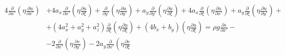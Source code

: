 \begin{equation*}
    \begin{split}
        4
        \frac
            {\partial }
            {\partial x'}
        \left(
            \eta
            \frac
                {\partial u}
                {\partial x'}
        \right)
        &
        +
        4
        a_x
        \frac
            {\partial }
            {\partial x'}
        \left(
            \eta
            \frac
                {\partial u}
                {\partial \xi}
        \right)
        +
        \frac
            {\partial }
            {\partial y'}
        \left(
            \eta
            \frac
                {\partial u}
                {\partial y'}
        \right)
        +
        a_y
        \frac
            {\partial }
            {\partial y'}
        \left(
            \eta
            \frac
                {\partial u}
                {\partial \xi}
        \right)
        +
        4
        a_x
        \frac
            {\partial }
            {\partial \xi}
        \left(
            \eta
            \frac
                {\partial u}
                {\partial x'}
        \right)
        +
        a_y
        \frac
            {\partial }
            {\partial \xi}
        \left(
            \eta
            \frac
                {\partial u}
                {\partial y'}
        \right)
        +
        \\
        &
        +
        \left(
            4
            a^2_x
            +
            a^2_y
            +
            a^2_z
        \right)
        \frac
            {\partial }
            {\partial \xi}
        \left(
            \eta
            \frac
                {\partial u}
                {\partial \xi}
        \right)
        +
        \left(
            4
            b_x
            +
            b_y
        \right)
        \left(
            \eta
            \frac
                {\partial u}
                {\partial \xi}
        \right)
        =
        \rho
        g
        \frac
            {\partial s}
            {\partial x'}
        -
        \\
        &
        -
        2
        \frac
            {\partial }
            {\partial x'}
        \left(
            \eta
            \frac
                {\partial v}
                {\partial y'}
        \right)
        -
        2
        a_y
        \frac
            {\partial }
            {\partial x'}
        \left(
            \eta
            \frac
                {\partial v}
                {\partial \xi}

\end{split}
\end{equation*}

